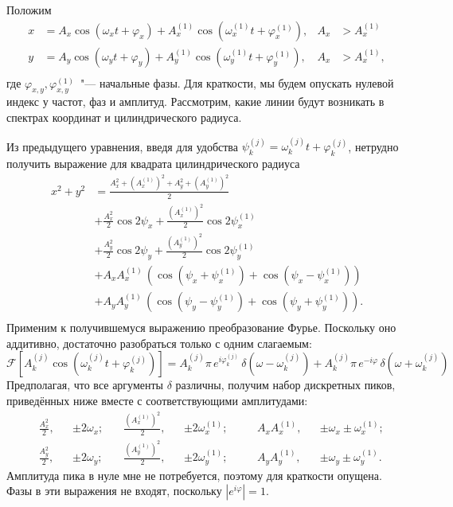 \documentclass[tikz]{trlnotes}
\begin{document}
Положим
\begin{equation}
  \begin{aligned}
    x &= A_x \cos (\omega_x t + φ_x) + A_x^{(1)} \cos(\omega_x^{(1)} t + φ_x^{(1)}), & A_x &> A_x^{(1)} \\
    y &= A_y \cos (\omega_y t + φ_y) + A_y^{(1)} \cos(\omega_y^{(1)} t + φ_y^{(1)}), & A_x &> A_x^{(1)}, \\
  \end{aligned}
\end{equation}
где $φ_{x,y}, φ_{x,y}^{(1)}$~"--- начальные фазы. Для краткости, мы будем опускать нулевой индекс у частот, фаз и амплитуд.
Рассмотрим, какие линии будут возникать в спектрах координат и цилиндрического радиуса. 

Из предыдущего уравнения, введя для удобства $ψ_k^{(j)} = ω_k^{(j)}t + φ_k^{(j)}$,
нетрудно получить выражение для квадрата цилиндрического радиуса
\begin{equation}
  \label{eq:xsqysqexpansion}
  \begin{split}
    x^2 + y^2  &= \frac{A_x^2 + \left(A_x^{(1)}\right)^2 + A_y^2 + \left(A_y^{(1)}\right)^2}{2} \\
               &+ \frac{A_x^2}{2} \cos 2ψ_x + \frac{\left(A_x^{(1)}\right)^2}{2} \cos 2ψ_x^{(1)} \\
         &+ \frac{A_y^2}{2} \cos 2ψ_y + \frac{\left(A_y^{(1)}\right)^2}{2} \cos 2ψ_y^{(1)} \\
         &+ A_x A_x^{(1)} \, \left( \cos (ψ_x + ψ_x^{(1)}) + \cos (ψ_x - ψ_x^{(1)}) \right) \\
         &+ A_y A_y^{(1)} \, \left( \cos (ψ_y - ψ_y^{(1)}) + \cos (ψ_y + ψ_y^{(1)}) \right). \\
  \end{split}
\end{equation}
Применим к получившемуся выражению преобразование Фурье. Поскольку оно аддитивно, достаточно разобраться только
с одним слагаемым:
\begin{equation}\label{eq:fftcos}
  \mathcal{F}\left[A_k^{(j)} \cos (ω_k^{(j)}t + φ_k^{(j)})\right] = 
  A_k^{(j)}\pi \, e^{iφ_{k}^{(j)}}\,δ(ω-ω_k^{(j)}) + A_k^{(j)}\pi\,e^{-iφ}\,δ(ω + ω_k^{(j)})
\end{equation}
Предполагая, что все аргументы $δ$ различны, получим набор дискретных пиков, приведённых ниже вместе с
соответствующими амплитудами:
\begin{equation}
  \label{eq:twooscpeaks}
  \begin{aligned}
    &\frac{A_x^2}{2}, & & \pm 2\omega_x;\quad
    &\frac{\left(A_x^{(1)}\right)^2}{2}, & & \pm 2\omega_x^{(1)};\quad
    &&A_x A_x^{(1)}, & & \pm \omega_x \pm \omega_x^{(1)}; \\
    &\frac{A_y^2}{2}, & & \pm 2\omega_y;\quad
    &\frac{\left(A_y^{(1)}\right)^2}{2}, & & \pm 2\omega_y^{(1)};\quad
    &&A_y A_y^{(1)}, & & \pm \omega_y \pm \omega_y^{(1)}.
  \end{aligned}
\end{equation}
Амплитуда пика в нуле мне не потребуется, поэтому для краткости опущена.
Фазы в эти выражения не входят, поскольку $|e^{iφ}|=1$.
\end{document}
